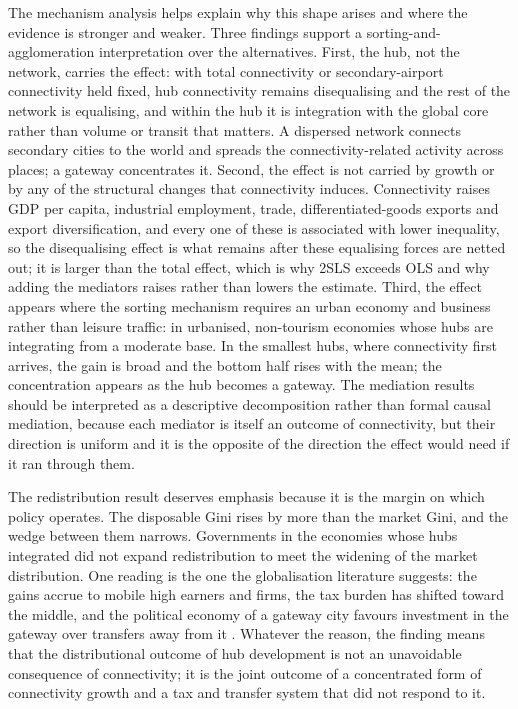 The mechanism analysis helps explain why this shape arises and where the evidence is stronger and weaker. Three findings support a sorting-and-agglomeration interpretation over the alternatives. First, the hub, not the network, carries the effect: with total connectivity or secondary-airport connectivity held fixed, hub connectivity remains disequalising and the rest of the network is equalising, and within the hub it is integration with the global core rather than volume or transit that matters. A dispersed network connects secondary cities to the world and spreads the connectivity-related activity across places; a gateway concentrates it. Second, the effect is not carried by growth or by any of the structural changes that connectivity induces. Connectivity raises GDP per capita, industrial employment, trade, differentiated-goods exports and export diversification, and every one of these is associated with lower inequality, so the disequalising effect is what remains after these equalising forces are netted out; it is larger than the total effect, which is why 2SLS exceeds OLS and why adding the mediators raises rather than lowers the estimate. Third, the effect appears where the sorting mechanism requires an urban economy and business rather than leisure traffic: in urbanised, non-tourism economies whose hubs are integrating from a moderate base. In the smallest hubs, where connectivity first arrives, the gain is broad and the bottom half rises with the mean; the concentration appears as the hub becomes a gateway. The mediation results should be interpreted as a descriptive decomposition rather than formal causal mediation, because each mediator is itself an outcome of connectivity, but their direction is uniform and it is the opposite of the direction the effect would need if it ran through them.

The redistribution result deserves emphasis because it is the margin on which policy operates. The disposable Gini rises by more than the market Gini, and the wedge between them narrows. Governments in the economies whose hubs integrated did not expand redistribution to meet the widening of the market distribution. One reading is the one the globalisation literature suggests: the gains accrue to mobile high earners and firms, the tax burden has shifted toward the middle, and the political economy of a gateway city favours investment in the gateway over transfers away from it \citep{Egger_2019,Kleven_2013}. Whatever the reason, the finding means that the distributional outcome of hub development is not an unavoidable consequence of connectivity; it is the joint outcome of a concentrated form of connectivity growth and a tax and transfer system that did not respond to it.

